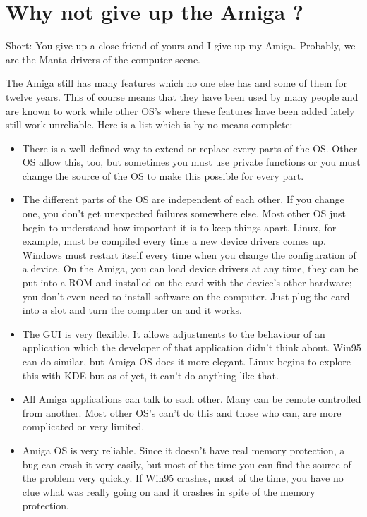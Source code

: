 \section{Why not give up the Amiga ?}

Short: You give up a close friend of yours and I give up my Amiga.
Probably, we are the Manta drivers of the computer scene.

The Amiga still has many features which no one else has and some of them
for twelve years. This of course means that they have been used by many
people and are known to work while other OS's where these features have been
added lately still work unreliable. Here is a list which is by no means
complete:

\begin{itemize}
\item There is a well defined way to extend or replace every parts of the OS.
Other OS allow this, too, but sometimes you must use private functions or
you must change the source of the OS to make this possible for every part.

\item The different parts of the OS are independent of each other.
If you change one, you don't get unexpected failures somewhere else.
Most other OS just begin to understand how important it is to keep
things apart. Linux, for example, must be compiled every time a new
device drivers comes up. Windows must restart itself every time when
you change the configuration of a device. On the Amiga, you can load
device drivers at any time, they can be put into a ROM and installed on the
card with the device's other hardware; you don't even need to install
software on the computer. Just plug the card into a slot and turn
the computer on and it works.

\item The GUI is very flexible. It allows adjustments to the behaviour of
an application which the developer of that application didn't think about.
Win95 can do similar, but Amiga OS does it more elegant. Linux begins to
explore this with KDE but as of yet, it can't do anything like that.

\item All Amiga applications can talk to each other. Many can be remote
controlled from another. Most other OS's can't do this and those who can,
are more complicated or very limited.

\item Amiga OS is very reliable. Since it doesn't have real memory
protection, a bug can crash it very easily, but most of the time you can
find the source of the problem very quickly. If Win95 crashes, most of the
time, you have no clue what was really going on and it crashes in spite
of the memory protection.


\end{itemize}
